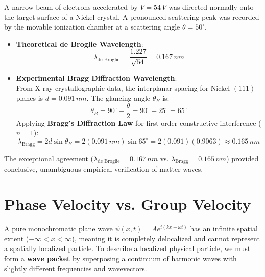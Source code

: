 A narrow beam of electrons accelerated by $V = 54\,\si{V}$ was directed normally onto the target surface of a Nickel crystal. A pronounced scattering peak was recorded by the movable ionization chamber at a scattering angle $\theta = 50^\circ$.
\begin{itemize}
    \item \textbf{Theoretical de Broglie Wavelength}:
    \begin{equation}
        \lambda_{\text{de Broglie}} = \frac{1.227}{\sqrt{54}} = 0.167\,\si{nm}
    \end{equation}
    \item \textbf{Experimental Bragg Diffraction Wavelength}:\\
    From X-ray crystallographic data, the interplanar spacing for Nickel $(111)$ planes is $d = 0.091\,\si{nm}$. The glancing angle $\theta_B$ is:
    \begin{equation}
        \theta_B = 90^\circ - \frac{\theta}{2} = 90^\circ - 25^\circ = 65^\circ
    \end{equation}
    Applying \textbf{Bragg's Diffraction Law} for first-order constructive interference ($n=1$):
    \begin{equation}
        \lambda_{\text{Bragg}} = 2 d \sin\theta_B = 2(0.091\,\si{nm})\sin 65^\circ = 2(0.091)(0.9063) \approx 0.165\,\si{nm}
    \end{equation}
\end{itemize}
The exceptional agreement ($\lambda_{\text{de Broglie}} = 0.167\,\si{nm}$ vs. $\lambda_{\text{Bragg}} = 0.165\,\si{nm}$) provided conclusive, unambiguous empirical verification of matter waves.

\section{Phase Velocity vs. Group Velocity}

A pure monochromatic plane wave $\psi(x,t) = A e^{i(k x - \omega t)}$ has an infinite spatial extent ($-\infty < x < \infty$), meaning it is completely delocalized and cannot represent a spatially localized particle. To describe a localized physical particle, we must form a \textbf{wave packet} by superposing a continuum of harmonic waves with slightly different frequencies and wavevectors.

